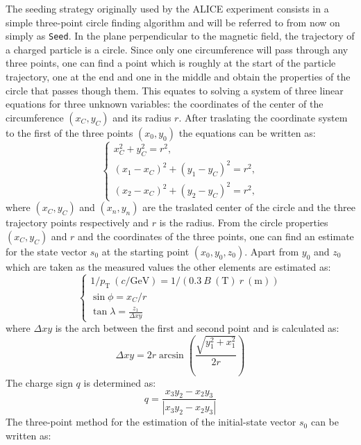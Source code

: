 The seeding strategy originally used by the ALICE experiment consists in a simple three-point circle finding algorithm and will be referred to from now on simply as \texttt{Seed}. In the plane perpendicular to the magnetic field, the trajectory of a charged particle is a circle. Since only one circumference will pass through any three points, one can find a point which is roughly at the start of the particle trajectory, one at the end and one in the middle and obtain the properties of the circle that passes though them. This equates to solving a system of three linear equations for three unknown variables: the coordinates of the center of the circumference $(x_C,y_C)$ and its radius $r$. After traslating the coordinate system to the first of the three points $(x_0,y_0)$ the equations can be written as:
\begin{equation}
\begin{cases} 
x_C^2+y_C^2 = r^2, \\
(x_1-x_C)^2+(y_1-y_C)^2=r^2, \\
(x_2-x_C)^2+(y_2-y_C)^2=r^2,
\end{cases}
\end{equation}
where $(x_C,y_C)$ and $(x_n,y_n)$ are the traslated center of the circle and the three trajectory points respectively and $r$ is the radius. From the circle properties $(x_C,y_C)$ and $r$ and the coordinates of the three points, one can find an estimate for the state vector $s_0$ at the starting point $(x_0,y_0,z_0)$. Apart from $y_0$ and $z_0$ which are taken as the measured values the other elements are estimated as:
\begin{equation}\label{eq:SeedPar}
    \begin{cases}
        1/p_\textrm{T} \ (c/\textrm{GeV})= 1/(0.3 \ B \ (\textrm{T})\ r\ (\textrm{m}))\\
        \sin \phi = x_C/r \\
        \tan \lambda = \frac{z_1}{\Delta xy}
    \end{cases}
\end{equation}
where $\Delta xy$ is the arch between the first and second point and is calculated as:
\begin{equation}
    \Delta xy = 2r \arcsin \left( \frac{\sqrt{y_1^2+x_1^2}}{2r}\right)
\end{equation}
The charge sign $q$ is determined as:
\begin{equation}
    q = \frac{x_3y_2-x_2y_3}{|x_3y_2-x_2y_3|}
\end{equation}
The three-point method for the estimation of the initial-state vector $s_0$ can be written as: 
